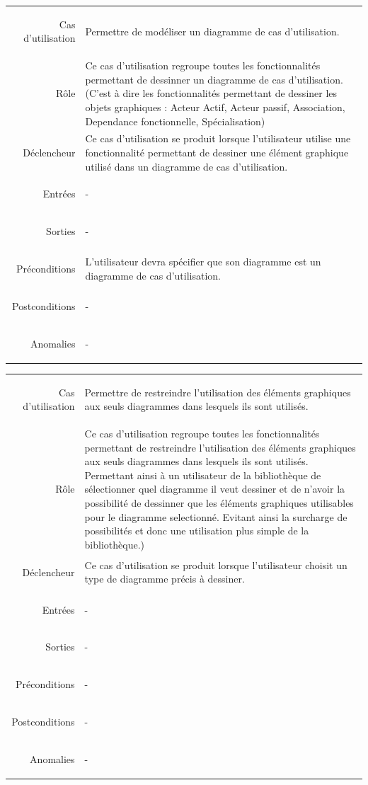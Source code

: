 \documentclass[12pt,a4paper,openany]{report}
\begin{document}
	\begin{longtable}{>{\begin{bf}} r <{\end{bf}}!{:}p{13.5cm}}
	Cas d'utilisation & Permettre de modéliser un diagramme de cas d'utilisation.\\
	Rôle & Ce cas d'utilisation regroupe toutes les fonctionnalités permettant de dessinner un diagramme de cas d'utilisation.
	(C'est à dire les fonctionnalités permettant de dessiner les objets graphiques : Acteur Actif, Acteur passif, Association,
	Dependance fonctionnelle, Spécialisation)\\
	Déclencheur & Ce cas d'utilisation se produit lorsque l'utilisateur utilise une fonctionnalité permettant de dessiner une
	élément graphique utilisé dans un diagramme de cas d'utilisation.\\
	Entrées & -\\
	Sorties & -\\
	Préconditions & L'utilisateur devra spécifier que son diagramme est un diagramme de cas d'utilisation.\\
	Postconditions & -\\
	Anomalies & -\\
	\end{longtable}
	\begin{longtable}{>{\begin{bf}} r <{\end{bf}}!{:}p{13.5cm}}
	Cas d'utilisation & Permettre de restreindre l'utilisation des éléments graphiques aux seuls diagrammes dans lesquels ils sont utilisés.\\
	Rôle & Ce cas d'utilisation regroupe toutes les fonctionnalités permettant de restreindre l'utilisation des éléments
	graphiques aux seuls diagrammes dans lesquels ils sont utilisés. Permettant ainsi à un utilisateur de la bibliothèque de sélectionner quel
	diagramme il veut dessiner et de n'avoir la possibilité de dessinner que les éléments graphiques utilisables pour le diagramme selectionné.
	Evitant ainsi la surcharge de possibilités et donc une utilisation plus simple de la bibliothèque.)\\
	Déclencheur & Ce cas d'utilisation se produit lorsque l'utilisateur choisit un type de diagramme précis à dessiner.\\
	Entrées & -\\
	Sorties & -\\
	Préconditions & -\\
	Postconditions & -\\
	Anomalies & -\\
	\end{longtable}
\end{document}
